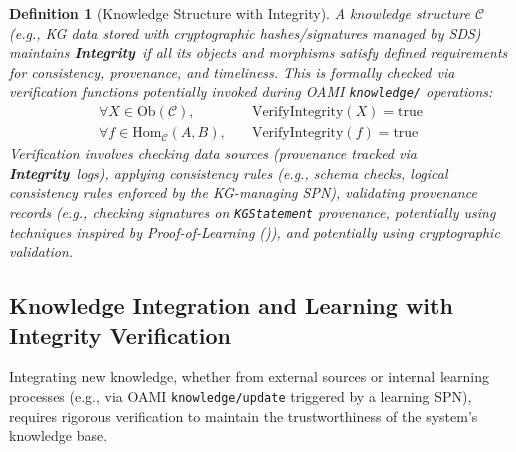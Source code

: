 \documentclass[12pt,a4paper]{report}
\renewcommand{\citep}[1]{\textit{\scriptsize{(\cite{#1})}}}
\newtheorem{definition}{Definition}[section]
\newcommand{\Integrity}{\textbf{Integrity}}
\begin{document}
	\begin{definition}[Knowledge Structure with Integrity]
		\label{def:knowledge_integrity}
		A knowledge structure $\mathcal{C}$ (e.g., KG data stored with cryptographic hashes/signatures managed by SDS) maintains \Integrity\ if all its objects and morphisms satisfy defined requirements for consistency, provenance, and timeliness. This is formally checked via verification functions potentially invoked during OAMI \texttt{knowledge/} operations:
		\begin{align}
			\forall X \in \text{Ob}(\mathcal{C}), &\quad \text{VerifyIntegrity}(X) = \text{true} \label{eq:obj_integrity} \\
			\forall f \in \text{Hom}_\mathcal{C}(A, B), &\quad \text{VerifyIntegrity}(f) = \text{true} \label{eq:morph_integrity}
		\end{align}
		Verification involves checking data sources (provenance tracked via \Integrity\ logs), applying consistency rules (e.g., schema checks, logical consistency rules enforced by the KG-managing SPN), validating provenance records (e.g., checking signatures on \texttt{KGStatement} provenance, potentially using techniques inspired by Proof-of-Learning \citep{Jia2021ProofOfLearning}), and potentially using cryptographic validation.
	\end{definition}
	
	\subsection{Knowledge Integration and Learning with Integrity Verification}
	\label{sec:2-3-2}
	
	Integrating new knowledge, whether from external sources or internal learning processes (e.g., via OAMI \texttt{knowledge/update} triggered by a learning SPN), requires rigorous verification to maintain the trustworthiness of the system's knowledge base.
	
\end{document}
